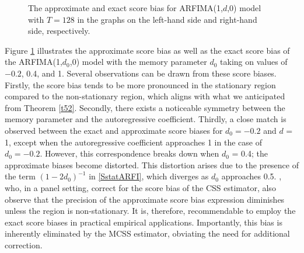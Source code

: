 {{\begin{figure}[H]
    \centering
   
\hspace{0mm}
   

\hspace{0mm}
   
    \caption{ The approximate and exact score bias for ARFIMA(1,$d$,0) model with $T = 128$ in the graphs on the left-hand side and right-hand side, respectively.}    \label{figic}\end{figure}

Figure \ref{figic} illustrates the approximate score bias as well as the exact score bias of the ARFIMA(1,$d_0$,0) model with the memory parameter $d_0$ taking on values of $-0.2$, 0.4, and 1. Several observations can be drawn from these score biases. Firstly, the score bias tends to be more pronounced in the stationary region compared to the non-stationary region, which aligns with what we anticipated from Theorem \ref{t52}. Secondly, there exists a noticeable symmetry between the memory parameter and the autoregressive coefficient. Thirdly, a close match is observed between the exact and approximate score biases for $d_0 = -0.2$ and $d$ = 1, except when the autoregressive coefficient approaches 1 in the case of $d_0 = -0.2$. However, this correspondence breaks down when $d_0$ = 0.4; the approximate biases become distorted. This distortion arises due to the presence of the term $(1-2d_0)^{-1}$ in \eqref{SstatARFI}, which diverges as $d_0$ approaches 0.5. \textcite{robinson2015efficient}, who, in a panel setting, correct for the score bias of the CSS estimator, also observe that the precision of the approximate score bias expression diminishes unless the region is non-stationary. It is, therefore, recommendable to employ the exact score biases in practical empirical applications. Importantly, this bias is inherently eliminated by the MCSS estimator, obviating the need for additional correction.



}}
